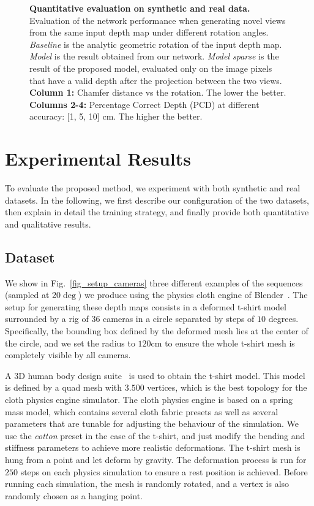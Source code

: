 \begin{figure}
\begin{tabular}{ccccc}
    \end{tabular}
    \caption[Quantitative evaluation on synthetic and real data]{{\bf Quantitative evaluation on synthetic and real data.} Evaluation of the network performance when generating novel views from the same input depth map under different rotation angles. {\em Baseline} is the analytic geometric rotation of the input depth map. {\em Model} is the result obtained from our network. {\em Model sparse} is the result of the proposed model, evaluated only on the image pixels that have a valid depth after the projection between the two views. \textbf{Column 1:} Chamfer distance vs the rotation. The lower the better. \textbf{Columns 2-4:} Percentage Correct Depth (PCD) at different accuracy: [1, 5, 10] cm. The higher the better.}
    \label{fig_plot_synth_rotations}
\end{figure}

\section{Experimental Results}
To evaluate the proposed method, we experiment with both synthetic and real datasets. In the following, we first describe our configuration of the two datasets, then explain in detail the training strategy, and finally provide both quantitative and qualitative results.

\subsection{Dataset}

\vspace{1mm}
 We show in Fig.~\ref{fig_setup_cameras} three different examples of the sequences (sampled at 20$\deg$) we produce using the physics cloth engine of Blender~\cite{Blender}. The setup for generating these depth maps consists in a deformed t-shirt model surrounded by a rig of $36$ cameras in a circle separated by steps of $10$ degrees. Specifically, the bounding box defined by the deformed mesh lies at the center of the circle, and we set the radius to $120$cm to ensure the whole t-shirt mesh is completely visible by all cameras.

A 3D human body design suite~\cite{Makehuman} is used to obtain the t-shirt model. This model is defined by a quad mesh with $3.500$ vertices, which is the best topology for the cloth physics engine simulator. The cloth physics engine is based on a spring mass model, which contains several cloth fabric presets as well as several parameters that are tunable for adjusting the behaviour of the simulation. We use the \textit{cotton} preset in the case of the t-shirt, and just modify the bending and stiffness parameters to achieve more realistic deformations. The t-shirt mesh is hung from  a point and let deform by gravity. The deformation process is run for $250$ steps on each physics simulation to ensure a rest position is achieved. Before running each simulation, the mesh is randomly rotated, and a vertex is also randomly chosen as a hanging point. 

